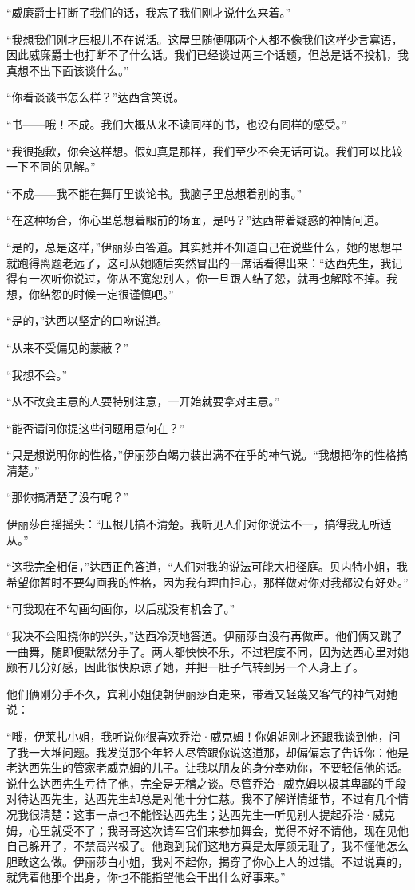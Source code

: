 \par “威廉爵士打断了我们的话，我忘了我们刚才说什么来着。”
\par “我想我们刚才压根儿不在说话。这屋里随便哪两个人都不像我们这样少言寡语，因此威廉爵士也打断不了什么话。我们已经谈过两三个话题，但总是话不投机，我真想不出下面该谈什么。”
\par “你看谈谈书怎么样？”达西含笑说。
\par “书——哦！不成。我们大概从来不读同样的书，也没有同样的感受。”
\par “我很抱歉，你会这样想。假如真是那样，我们至少不会无话可说。我们可以比较一下不同的见解。”
\par “不成——我不能在舞厅里谈论书。我脑子里总想着别的事。”
\par “在这种场合，你心里总想着眼前的场面，是吗？”达西带着疑惑的神情问道。
\par “是的，总是这样，”伊丽莎白答道。其实她并不知道自己在说些什么，她的思想早就跑得离题老远了，这可从她随后突然冒出的一席话看得出来：“达西先生，我记得有一次听你说过，你从不宽恕别人，你一旦跟人结了怨，就再也解除不掉。我想，你结怨的时候一定很谨慎吧。”
\par “是的，”达西以坚定的口吻说道。
\par “从来不受偏见的蒙蔽？”
\par “我想不会。”
\par “从不改变主意的人要特别注意，一开始就要拿对主意。”
\par “能否请问你提这些问题用意何在？”
\par “只是想说明你的性格，”伊丽莎白竭力装出满不在乎的神气说。“我想把你的性格搞清楚。”
\par “那你搞清楚了没有呢？”
\par 伊丽莎白摇摇头：“压根儿搞不清楚。我听见人们对你说法不一，搞得我无所适从。”
\par “这我完全相信，”达西正色答道，“人们对我的说法可能大相径庭。贝内特小姐，我希望你暂时不要勾画我的性格，因为我有理由担心，那样做对你对我都没有好处。”
\par “可我现在不勾画勾画你，以后就没有机会了。”
\par “我决不会阻挠你的兴头，”达西冷漠地答道。伊丽莎白没有再做声。他们俩又跳了一曲舞，随即便默然分手了。两人都怏怏不乐，不过程度不同，因为达西心里对她颇有几分好感，因此很快原谅了她，并把一肚子气转到另一个人身上了。
\par 他们俩刚分手不久，宾利小姐便朝伊丽莎白走来，带着又轻蔑又客气的神气对她说：
\par “哦，伊莱扎小姐，我听说你很喜欢乔治·威克姆！你姐姐刚才还跟我谈到他，问了我一大堆问题。我发觉那个年轻人尽管跟你说这道那，却偏偏忘了告诉你：他是老达西先生的管家老威克姆的儿子。让我以朋友的身分奉劝你，不要轻信他的话。说什么达西先生亏待了他，完全是无稽之谈。尽管乔治·威克姆以极其卑鄙的手段对待达西先生，达西先生却总是对他十分仁慈。我不了解详情细节，不过有几个情况我很清楚：这事一点也不能怪达西先生；达西先生一听见别人提起乔治·威克姆，心里就受不了；我哥哥这次请军官们来参加舞会，觉得不好不请他，现在见他自己躲开了，不禁高兴极了。他跑到我们这地方真是太厚颜无耻了，我不懂他怎么胆敢这么做。伊丽莎白小姐，我对不起你，揭穿了你心上人的过错。不过说真的，就凭着他那个出身，你也不能指望他会干出什么好事来。”
